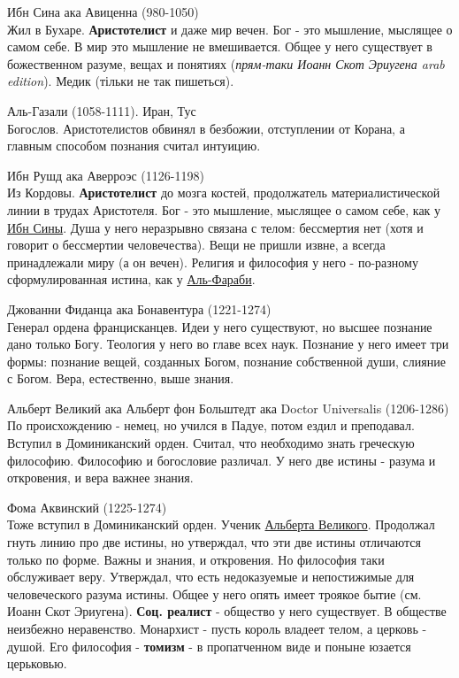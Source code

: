 \documentclass[12pt,a4paper]{article}
\begin{document}
Ибн Сина ака Авиценна (980-1050)\\
Жил в Бухаре. \textbf{Аристотелист} и даже мир вечен. Бог - это мышление, мыслящее о самом себе. В мир это мышление не вмешивается. Общее у него существует в божественном разуме, вещах и понятиях (\textit{прям-таки Иоанн Скот Эриугена arab edition}). Медик (тільки не так пишеться).

Аль-Газали (1058-1111). Иран, Тус\\
Богослов. Аристотелистов обвинял в безбожии, отступлении от Корана, а главным способом познания считал интуицию. 

Ибн Рушд ака Аверроэс (1126-1198)\\ 
Из Кордовы. \textbf{Аристотелист} до мозга костей, продолжатель материалистической линии в трудах Аристотеля. Бог - это мышление, мыслящее о самом себе, как у \underline{Ибн Сины}. Душа у него неразрывно связана с телом: бессмертия нет (хотя и говорит о бессмертии человечества). Вещи не пришли извне, а всегда принадлежали миру (а он вечен). Религия и философия у него - по-разному сформулированная истина, как у \underline{Аль-Фараби}.

Джованни Фиданца ака Бонавентура (1221-1274)\\ 
Генерал ордена францисканцев. Идеи у него существуют, но высшее познание дано только Богу. Теология у него во главе всех наук. Познание у него имеет три формы: познание вещей, созданных Богом, познание собственной души, слияние с Богом. Вера, естественно, выше знания.

Альберт Великий  ака Альберт фон Больштедт ака Doctor Universalis (1206-1286)\\
По происхождению - немец, но учился в Падуе, потом ездил и преподавал. Вступил в Доминиканский орден. Считал, что необходимо знать греческую философию. Философию и богословие различал. У него две истины - разума и откровения, и вера важнее знания.

Фома Аквинский (1225-1274)\\
 Тоже вступил в Доминиканский орден. Ученик \underline{Альберта Великого}. Продолжал гнуть линию про две истины, но утверждал, что эти две истины отличаются только по форме. Важны и знания, и откровения. Но философия таки обслуживает веру. Утверждал, что есть недоказуемые и непостижимые для человеческого разума истины. Общее у него опять имеет троякое бытие (см. Иоанн Скот Эриугена). \textbf{Соц. реалист} - общество у него существует. В обществе неизбежно неравенство. Монархист - пусть король владеет телом, а церковь - душой. Его философия - \textbf{томизм} - в пропатченном виде и поныне юзается церьковью.
\end{document}

